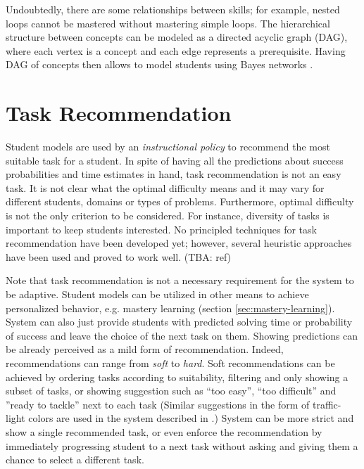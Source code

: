 Undoubtedly, there are some relationships between skills;
  for example, nested loops cannot be mastered without mastering simple loops.
The hierarchical structure between concepts can be modeled
  as a directed acyclic graph (DAG),
  where each vertex is a concept and each edge represents a prerequisite.
Having DAG of concepts then allows to model students using Bayes networks
  \cite{its-programming}.


\section{Task Recommendation}
\label{sec:task-recommendation}

Student models are used by an \emph{instructional policy} to recommend
  the most suitable task for a student.
In spite of having all the predictions about success probabilities
  and time estimates in hand,
  task recommendation is not an easy task.
It is not clear what the optimal difficulty means and it may vary
  for different students, domains or types of problems.
Furthermore, optimal difficulty is not the only criterion to be considered.
For instance, diversity of tasks is important to keep students interested.
No principled techniques for task recommendation have been developed yet;
however, several heuristic approaches have been used
  and proved to work well. (TBA: ref)


Note that task recommendation is not a necessary requirement
  for the system to be adaptive.
Student models can be utilized in other means to achieve personalized behavior,
  e.g. mastery learning (section \ref{sec:mastery-learning}).
System can also just provide students with predicted solving time
  or probability of success
  and leave the choice of the next task on them.
Showing predictions can be already perceived as a mild form of recommendation.
Indeed, recommendations can range from \emph{soft} to \emph{hard}.
Soft recommendations can be achieved by
  ordering tasks according to suitability,
  filtering and only showing a subset of tasks,
  or showing suggestion such as
  ``too easy'', ``too difficult'' and ''ready to tackle'' next to each task
  (Similar suggestions in the form of traffic-light colors
  are used in the system described in \cite{its-programming}.)
System can be more strict and show a single recommended task,
  or even enforce the recommendation by immediately progressing student to
  a next task without asking and giving them a chance to select a different task.

